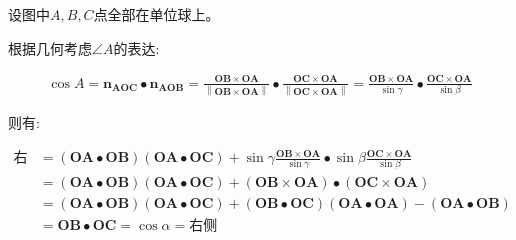 \documentclass[UTF8,c5size]{ctexart}
\begin{document}
设图中$A,B,C$点全部在单位球上。

根据几何考虑$\angle A$的表达:

\begin{equation*}
    \begin{split}
        \cos{A}=\bm{n_{AOC}}\bullet\bm{n_{AOB}}=
        \frac{\bm{OB}\times\bm{OA}}{\left\|\bm{OB}\times\bm{OA}\right\|}
        \bullet
        \frac{\bm{OC}\times\bm{OA}}{\left\|\bm{OC}\times\bm{OA}\right\|}
        =
        \frac{\bm{OB}\times\bm{OA}}{\sin{\gamma}}
        \bullet
        \frac{\bm{OC}\times\bm{OA}}{\sin{\beta}}
    \end{split}
\end{equation*}

则有:

\begin{equation*}
    \begin{split}
        \text{右侧}&=(\bm{OA}\bullet\bm{OB})(\bm{OA}\bullet\bm{OC})+\sin{\gamma}\frac{\bm{OB}\times\bm{OA}}{\sin{\gamma}}
        \bullet
        \sin{\beta}\frac{\bm{OC}\times\bm{OA}}{\sin{\beta}}
        \\&=(\bm{OA}\bullet\bm{OB})(\bm{OA}\bullet\bm{OC})+
        (\bm{OB}\times\bm{OA})
        \bullet
        (\bm{OC}\times\bm{OA})
        \\&=(\bm{OA}\bullet\bm{OB})(\bm{OA}\bullet\bm{OC})+
        (\bm{OB}\bullet\bm{OC})(\bm{OA}\bullet\bm{OA})-(\bm{OA}\bullet\bm{OB})
        \\&=\bm{OB}\bullet\bm{OC}=\cos{\alpha}=\text{右侧}
    \end{split}
\end{equation*}
\end{document}

